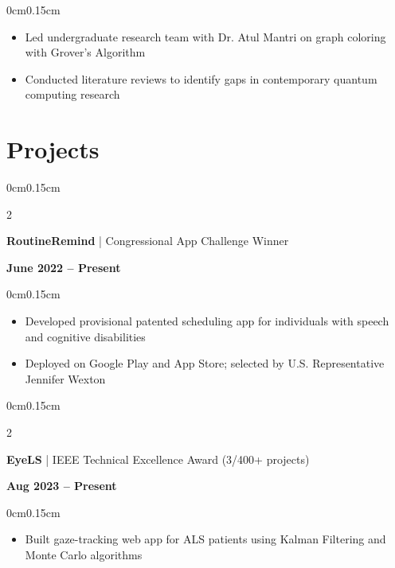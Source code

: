 \documentclass[10pt, letterpaper]{article}
\newenvironment{highlights}{
    \begin{itemize}[topsep=0pt, parsep=0pt, partopsep=0pt, itemsep=0pt, leftmargin=0.4cm]
}{
    \end{itemize}
}
\newenvironment{onecolentry}{
    \begin{adjustwidth}{0cm}{0.15cm}
}{
    \end{adjustwidth}
}
\newenvironment{twocolentry}[2][]{
    \onecolentry
    \def\secondColumn{#2}
    \setcolumnwidth{\fill, 4cm}
    \begin{paracol}{2}
}{
    \switchcolumn \raggedleft \secondColumn
    \end{paracol}
    \endonecolentry
}
\begin{document}
    \begin{onecolentry}
        \begin{highlights}
            \item Led undergraduate research team with Dr. Atul Mantri on graph coloring with Grover's Algorithm
            \item Conducted literature reviews to identify gaps in contemporary quantum computing research
        \end{highlights}
    \end{onecolentry}

    \vspace{0.05cm}
    \section{Projects}
    \vspace{0.05cm}

    \begin{twocolentry}{\textbf{June 2022 -- Present}}
        \textbf{RoutineRemind} | Congressional App Challenge Winner
    \end{twocolentry}

    \begin{onecolentry}
        \begin{highlights}
            \item Developed provisional patented scheduling app for individuals with speech and cognitive disabilities
            \item Deployed on Google Play and App Store; selected by U.S. Representative Jennifer Wexton
        \end{highlights}
    \end{onecolentry}

    \vspace{0.05cm}

    \begin{twocolentry}{\textbf{Aug 2023 -- Present}}
        \textbf{EyeLS} | IEEE Technical Excellence Award (3/400+ projects)
    \end{twocolentry}

    \begin{onecolentry}
        \begin{highlights}
            \item Built gaze-tracking web app for ALS patients using Kalman Filtering and Monte Carlo algorithms
        \end{highlights}
    \end{onecolentry}
\end{document}

